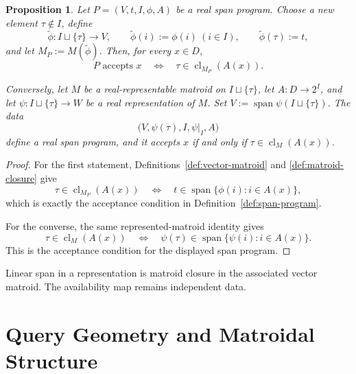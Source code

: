 \documentclass[11pt]{article}
\numberwithin{equation}{section}
\newtheorem{proposition}[definition]{Proposition}
\theoremstyle{remark}
\newcommand{\cl}{\operatorname{cl}}
\begin{document}
\begin{proposition}
\label{prop:span-program-matroid-shadow}
Let $P=(V,t,I,\phi,A)$ be a real span program. Choose a new element
$\tau\notin I$, define
\begin{equation}
    \widetilde\phi:I\sqcup\{\tau\}\to V,
    \qquad
    \widetilde\phi(i):=\phi(i)\ (i\in I),
    \qquad
    \widetilde\phi(\tau):=t,
\end{equation}
and let $M_P:=M(\widetilde\phi)$. Then, for every $x\in D$,
\begin{equation}
    P\text{ accepts }x
    \quad\Longleftrightarrow\quad
    \tau\in\cl_{M_P}(A(x)).
\end{equation}

Conversely, let $M$ be a real-representable matroid on
$I\sqcup\{\tau\}$, let $A:D\to2^I$, and let
$\psi:I\sqcup\{\tau\}\to W$ be a real representation of $M$. Set
$V:=\operatorname{span}\psi(I\sqcup\{\tau\})$. The data
\begin{equation}
    \bigl(V,\psi(\tau),I,\psi|_I,A\bigr)
\end{equation}
define a real span program, and it accepts $x$ if and only if
$\tau\in\cl_M(A(x))$.
\end{proposition}

\begin{proof}
For the first statement, Definitions~\ref{def:vector-matroid} and
\ref{def:matroid-closure} give
\begin{equation}
    \tau\in\cl_{M_P}(A(x))
    \quad\Longleftrightarrow\quad
    t\in\operatorname{span}\{\phi(i):i\in A(x)\},
\end{equation}
which is exactly the acceptance condition in
Definition~\ref{def:span-program}.

For the converse, the same represented-matroid identity gives
\begin{equation}
    \tau\in\cl_M(A(x))
    \quad\Longleftrightarrow\quad
    \psi(\tau)\in\operatorname{span}\{\psi(i):i\in A(x)\}.
\end{equation}
This is the acceptance condition for the displayed span program.
\end{proof}

Linear span in a representation is matroid closure in the associated vector matroid. The availability map remains independent data.


\part{Query Geometry and Matroidal Structure}
\end{document}
